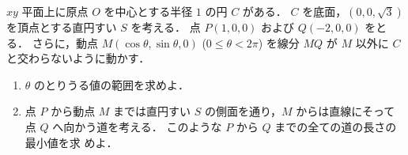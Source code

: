 \documentclass[../../main.tex]{subfiles}
\begin{document}
$xy$ 平面上に原点 $O$ を中心とする半径 $1$ の円 $C$ がある．
$C$ を底面，$(0,0,\sqrt{3})$ を頂点とする直円すい $S$ を考える．
点 $P(1,0,0)$ および $Q(-2,0,0)$ をとる．
さらに，動点 $M(\cos\theta,\sin\theta,0)$ ($0 \leq \theta < 2\pi$) を線分 $MQ$ が $M$ 以外に $C$ と交わらないように動かす．

\begin{enumerate}
  \item
    $\theta$ のとりうる値の範囲を求めよ．

  \item
    点 $P$ から動点 $M$ までは直円すい $S$ の側面を通り，$M$ からは直線にそって点 $Q$ へ向かう道を考える．
    このような $P$ から $Q$ までの全ての道の長さの最小値を求 めよ．
\end{enumerate}
\end{document}

